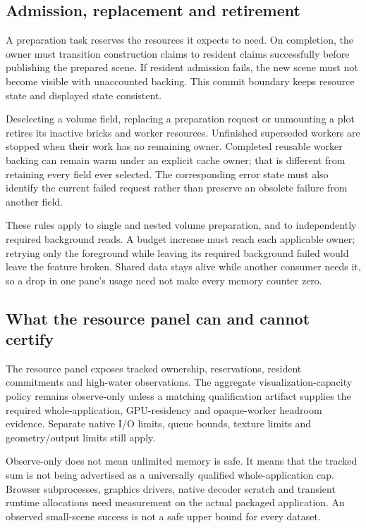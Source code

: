 

\subsection{Admission, replacement and retirement}
A preparation task reserves the resources it expects to need. On completion,
the owner must transition construction claims to resident claims successfully
before publishing the prepared scene. If resident admission fails, the new
scene must not become visible with unaccounted backing. This commit boundary
keeps resource state and displayed state consistent.

Deselecting a volume field, replacing a preparation request or unmounting a
plot retires its inactive bricks and worker resources. Unfinished superseded
workers are stopped when their work has no remaining owner. Completed reusable
worker backing can remain warm under an explicit cache owner; that is different
from retaining every field ever selected. The corresponding error state must
also identify the current failed request rather than preserve an obsolete
failure from another field.

These rules apply to single and nested volume preparation, and to independently
required background reads. A budget increase must reach each applicable owner;
retrying only the foreground while leaving its required background failed would
leave the feature broken. Shared data stays alive while another consumer
needs it, so a drop in one pane's usage need not make every memory counter zero.

\subsection{What the resource panel can and cannot certify}
The resource panel exposes tracked ownership, reservations, resident commitments
and high-water observations. The aggregate visualization-capacity policy remains
observe-only unless a matching qualification artifact supplies the required
whole-application, GPU-residency and opaque-worker headroom evidence. Separate
native I/O limits, queue bounds, texture limits and geometry/output limits still
apply.

Observe-only does not mean unlimited memory is safe. It means that the tracked
sum is not being advertised as a universally qualified whole-application cap.
Browser subprocesses, graphics drivers, native decoder scratch and transient
runtime allocations need measurement on the actual packaged application.
An observed small-scene success is not a safe upper bound for every dataset.

